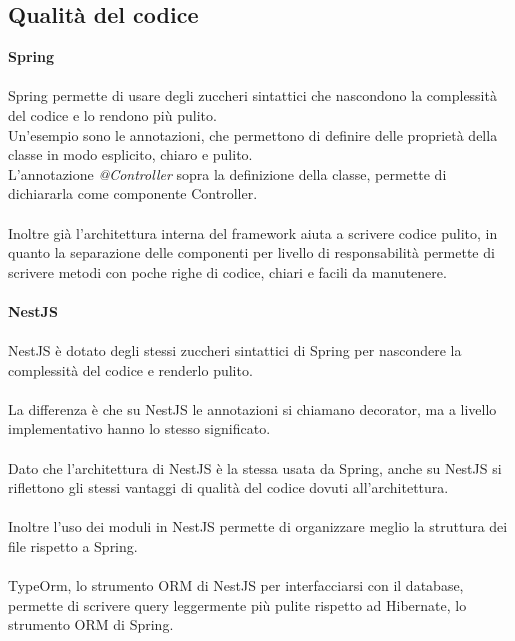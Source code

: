 \subsection{Qualità del codice}
\textbf{Spring}
\\\\
Spring permette di usare degli zuccheri sintattici che nascondono la complessità del codice e lo rendono più
pulito.
\\
Un'esempio sono le annotazioni, che permettono di definire delle proprietà della classe in modo esplicito, chiaro e pulito.
\\
L'annotazione \textit{@Controller} sopra la definizione della
classe, permette di dichiararla come componente Controller.
\\\\
Inoltre già l'architettura interna del framework aiuta a scrivere codice pulito, in quanto la separazione delle
componenti per livello di responsabilità permette di scrivere metodi con poche righe di codice, chiari e
facili da manutenere.
\\\\
\textbf{NestJS}
\\\\
NestJS è dotato degli stessi zuccheri sintattici di Spring per nascondere la complessità del codice e renderlo pulito.
\\\\
La differenza è che su NestJS le annotazioni si chiamano decorator, ma a livello implementativo hanno lo 
stesso significato.
\\\\
Dato che l'architettura di NestJS è la stessa usata da Spring, anche su NestJS si riflettono gli stessi vantaggi di
qualità del codice dovuti all'architettura.
\\\\
Inoltre l'uso dei moduli in NestJS permette di organizzare meglio la struttura dei file rispetto a Spring.
\\\\
TypeOrm, lo strumento ORM di NestJS per interfacciarsi con il database, permette di scrivere query leggermente più
pulite rispetto ad Hibernate, lo strumento ORM di Spring.

